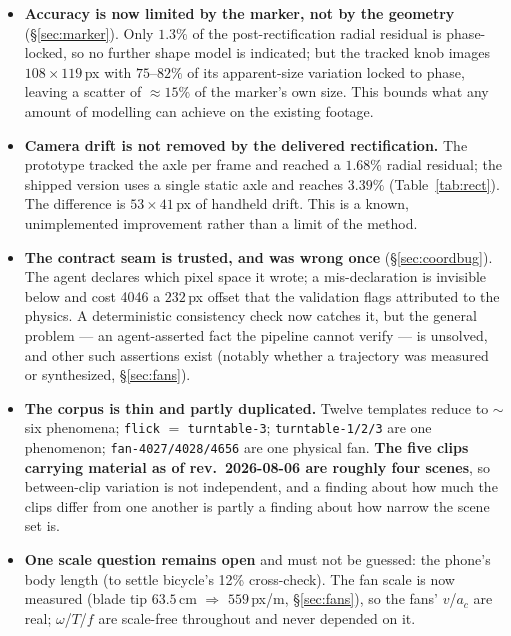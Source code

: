 \documentclass[11pt,a4paper]{article}
\begin{document}
\begin{itemize}
  ($0.02$--$0.13\%$ on mean $\omega$ between two unrelated models), which constrains the
  time-averaged quantities but says nothing about absolute scale, since both trackers consume the
  same calibration.
  \item \textbf{Accuracy is now limited by the marker, not by the geometry} (\S\ref{sec:marker}).
  Only $1.3\%$ of the post-rectification radial residual is phase-locked, so no further shape
  model is indicated; but the tracked knob images $108\times119$\,px with $75$--$82\%$ of its
  apparent-size variation locked to phase, leaving a scatter of $\approx 15\%$ of the marker's own
  size. This bounds what any amount of modelling can achieve on the existing footage.
  \item \textbf{Camera drift is not removed by the delivered rectification.} The prototype tracked
  the axle per frame and reached a $1.68\%$ radial residual; the shipped version uses a single
  static axle and reaches $3.39\%$ (Table~\ref{tab:rect}). The difference is $53\times41$\,px of
  handheld drift. This is a known, unimplemented improvement rather than a limit of the method.
  \item \textbf{The contract seam is trusted, and was wrong once} (\S\ref{sec:coordbug}). The agent
  declares which pixel space it wrote; a mis-declaration is invisible below and cost 4046 a $232$\,px
  offset that the validation flags attributed to the physics. A deterministic consistency check now
  catches it, but the general problem --- an agent-asserted fact the pipeline cannot verify --- is
  unsolved, and other such assertions exist (notably whether a trajectory was measured or
  synthesized, \S\ref{sec:fans}).
  \item \textbf{The corpus is thin and partly duplicated.} Twelve templates reduce to
  $\sim$six phenomena; \texttt{flick} $=$ \texttt{turntable-3}; \texttt{turntable-1/2/3} are one
  phenomenon; \texttt{fan-4027/4028/4656} are one physical fan. \textbf{The five clips carrying
  material as of rev.\ 2026-08-06 are roughly four scenes}, so between-clip variation is not
  independent, and a finding about how much the clips differ from one another is partly a finding
  about how narrow the scene set is.
  \item \textbf{One scale question remains open} and must not be guessed: the phone's body length
  (to settle bicycle's 12\% cross-check). The fan scale is now measured (blade tip $63.5$\,cm
  $\Rightarrow$ $559$\,px/m, \S\ref{sec:fans}), so the fans' $v$/$a_c$ are real; $\omega$/$T$/$f$ are
  scale-free throughout and never depended on it.

\end{itemize}
\end{document}
